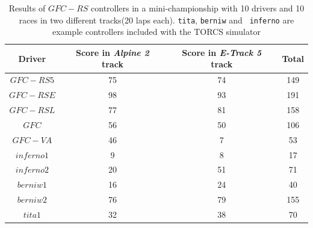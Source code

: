 \documentclass[10pt,journal,compsoc]{IEEEtran}
\begin{document}
\begin{table}[ht]
	\centering
	{\scriptsize
		\caption{ Results of $GFC-RS$ controllers in a mini-championship with 10 drivers and 10
			races in two different tracks(20 laps each). {\tt tita}, {\tt berniw} and {\tt
				inferno} are example controllers included with the TORCS
			simulator \cite{torcs4}}
		{
			\begin{tabular}{|c|c|c||c|}
				\hline
				Driver&Score in \textit{Alpine 2} track &Score in \textit{E-Track 5} track &Total\\
				\hline
				\hline
				
			$GFC-RS5$&	75	&74&	149\\
			$GFC-RSE$&	98	&93&	191\\
			$GFC-RSL$&	77	&81&	158\\
			$GFC$	&	56	&50&	106\\
			$GFC-VA$	&	46	&7&		53\\
			$inferno1$&	9	&8&		17\\
			$inferno2$&		20	&51&	71\\
			$berniw1$&	16	&24&	40\\
			$berniw2$&	76	&79&	155\\
			$tita1$&32	&38&	70\\		
				\hline
				
			\end{tabular}
		}\label{tab:RSresults}
	}
\end{table}
%
\end{document}
